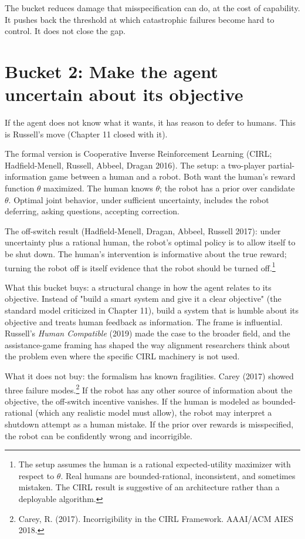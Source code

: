 The bucket reduces damage that misspecification can do, at the cost of capability. It pushes back the threshold at which catastrophic failures become hard to control. It does not close the gap.

\section*{Bucket 2: Make the agent uncertain about its objective}

If the agent does not know what it wants, it has reason to defer to humans. This is Russell's move (Chapter 11 closed with it).

The formal version is Cooperative Inverse Reinforcement Learning (CIRL; Hadfield-Menell, Russell, Abbeel, Dragan 2016). The setup: a two-player partial-information game between a human and a robot. Both want the human's reward function $\theta$ maximized. The human knows $\theta$; the robot has a prior over candidate $\theta$. Optimal joint behavior, under sufficient uncertainty, includes the robot deferring, asking questions, accepting correction.

The off-switch result (Hadfield-Menell, Dragan, Abbeel, Russell 2017): under uncertainty plus a rational human, the robot's optimal policy is to allow itself to be shut down. The human's intervention is informative about the true reward; turning the robot off is itself evidence that the robot should be turned off.\footnote{The setup assumes the human is a rational expected-utility maximizer with respect to $\theta$. Real humans are bounded-rational, inconsistent, and sometimes mistaken. The CIRL result is suggestive of an architecture rather than a deployable algorithm.}

What this bucket buys: a structural change in how the agent relates to its objective. Instead of "build a smart system and give it a clear objective" (the standard model criticized in Chapter 11), build a system that is humble about its objective and treats human feedback as information. The frame is influential. Russell's \emph{Human Compatible} (2019) made the case to the broader field, and the assistance-game framing has shaped the way alignment researchers think about the problem even where the specific CIRL machinery is not used.

What it does not buy: the formalism has known fragilities. Carey (2017) showed three failure modes.\footnote{Carey, R. (2017). Incorrigibility in the CIRL Framework. AAAI/ACM AIES 2018.} If the robot has any other source of information about the objective, the off-switch incentive vanishes. If the human is modeled as bounded-rational (which any realistic model must allow), the robot may interpret a shutdown attempt as a human mistake. If the prior over rewards is misspecified, the robot can be confidently wrong and incorrigible.

